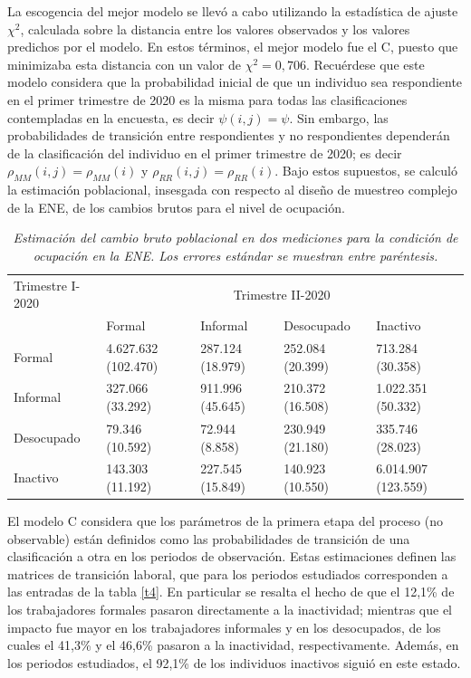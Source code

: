 \documentclass[
  10pt,
  spanish,
]{book}
\begin{document}
La escogencia del mejor modelo se llevó a cabo utilizando la estadística de ajuste \(\chi^2\), calculada sobre la distancia entre los valores observados y los valores predichos por el modelo. En estos términos, el mejor modelo fue el C, puesto que minimizaba esta distancia con un valor de \(\chi^2 = 0,706\). Recuérdese que este modelo considera que la probabilidad inicial de que un individuo sea respondiente en el primer trimestre de 2020 es la misma para todas las clasificaciones contempladas en la encuesta, es decir \(\psi(i,j)=\psi\). Sin embargo, las probabilidades de transición entre respondientes y no respondientes dependerán de la clasificación del individuo en el primer trimestre de 2020; es decir \(\rho_{MM}(i,j)=\rho_{MM}(i)\) y \(\rho_{RR}(i,j)=\rho_{RR}(i)\). Bajo estos supuestos, se calculó la estimación poblacional, insesgada con respecto al diseño de muestreo complejo de la ENE, de los cambios brutos para el nivel de ocupación.

\begin{table}[!h]
\centering
{\footnotesize
\begin{tabular}{lllll}
Trimestre I-2020&\multicolumn{4}{c}{Trimestre II-2020}\\\cline{2-5}
                        & Formal                    & Informal          &Desocupado         &Inactivo   \\\hline
Formal              & 4.627.632 (102.470)   & 287.124 (18.979)  & 252.084 (20.399)  & 713.284 (30.358) \\
Informal            & 327.066 (33.292)      & 911.996 (45.645)  & 210.372 (16.508)  & 1.022.351 (50.332) \\
Desocupado              & 79.346 (10.592)       & 72.944 (8.858)      & 230.949 (21.180)    & 335.746 (28.023) \\
Inactivo        & 143.303 (11.192)        & 227.545 (15.849)  & 140.923 (10.550)    & 6.014.907 (123.559) \\\hline
\end{tabular}
\caption{\emph{Estimación del cambio bruto poblacional en dos mediciones para la condición de ocupación en la ENE. Los errores estándar se muestran entre paréntesis.}}}
\label{t3}
\end{table}

El modelo C considera que los parámetros de la primera etapa del proceso (no observable) están definidos como las probabilidades de transición de una clasificación a otra en los periodos de observación. Estas estimaciones definen las matrices de transición laboral, que para los periodos estudiados corresponden a las entradas de la tabla \ref{t4}. En particular se resalta el hecho de que el 12,1\% de los trabajadores formales pasaron directamente a la inactividad; mientras que el impacto fue mayor en los trabajadores informales y en los desocupados, de los cuales el 41,3\% y el 46,6\% pasaron a la inactividad, respectivamente. Además, en los periodos estudiados, el 92,1\% de los individuos inactivos siguió en este estado.
\end{document}
